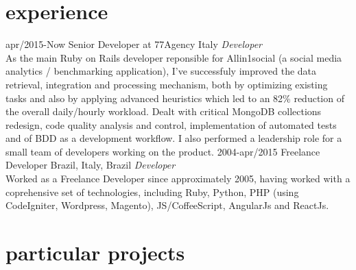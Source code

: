 \documentclass[]{friggeri-cv} %
\begin{document}

\section{experience}
\begin{entrylist}
\entry
{apr/2015-Now}
{Senior Developer at 77Agency}
{Italy}
{\emph{Developer} \\ As the main Ruby on Rails developer reponsible for Allin1social (a
social media analytics / benchmarking application), I've successfuly improved the data retrieval,
integration and processing mechanism, both by optimizing existing tasks and 
also by applying advanced heuristics which led to an 82\% reduction of the overall daily/hourly
workload. Dealt with critical MongoDB collections redesign, code quality analysis 
and control, implementation of automated tests and of BDD as a development workflow.
I also performed a leadership role for a small team of developers working on the product.
}
\entry
{2004-apr/2015}
{Freelance Developer}
{Brazil, Italy, Brazil}
{\emph{Developer} \\ Worked as a Freelance Developer since approximately 2005, having 
worked with a coprehensive set of technologies, including Ruby, Python, PHP (using CodeIgniter, Wordpress, Magento), JS/CoffeeScript, AngularJs and ReactJs.
}
\end{entrylist}


\section{particular projects}
\end{document}
